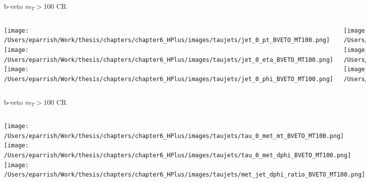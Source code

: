 \documentclass[aspectratio=169,xcolor=table]{beamer}
\begin{document}
    \begin{frame}[t]{b-veto $m_{T}>100$ CR}
      \begin{columns}[t]
          \texttt{[image: /Users/eparrish/Work/thesis/chapters/chapter6\_HPlus/images/taujets/jet\_0\_pt\_BVETO\_MT100.png]}
          \texttt{[image: /Users/eparrish/Work/thesis/chapters/chapter6\_HPlus/images/taujets/jet\_0\_eta\_BVETO\_MT100.png]}
          \texttt{[image: /Users/eparrish/Work/thesis/chapters/chapter6\_HPlus/images/taujets/jet\_0\_phi\_BVETO\_MT100.png]}

          \texttt{[image: /Users/eparrish/Work/thesis/chapters/chapter6\_HPlus/images/taujets/jet\_1\_pt\_BVETO\_MT100.png]}
          \texttt{[image: /Users/eparrish/Work/thesis/chapters/chapter6\_HPlus/images/taujets/jet\_1\_eta\_BVETO\_MT100.png]}
          \texttt{[image: /Users/eparrish/Work/thesis/chapters/chapter6\_HPlus/images/taujets/jet\_1\_phi\_BVETO\_MT100.png]}

          \texttt{[image: /Users/eparrish/Work/thesis/chapters/chapter6\_HPlus/images/taujets/jet\_2\_pt\_BVETO\_MT100.png]}
          \texttt{[image: /Users/eparrish/Work/thesis/chapters/chapter6\_HPlus/images/taujets/jet\_2\_eta\_BVETO\_MT100.png]}
          \texttt{[image: /Users/eparrish/Work/thesis/chapters/chapter6\_HPlus/images/taujets/jet\_2\_phi\_BVETO\_MT100.png]}

          \texttt{[image: /Users/eparrish/Work/thesis/chapters/chapter6\_HPlus/images/taujets/effm\_tau\_BVETO\_MT100.png]}

      \end{columns}
    \end{frame}

    \begin{frame}[t]{b-veto $m_{T}>100$ CR}
      \begin{columns}[t]
          \texttt{[image: /Users/eparrish/Work/thesis/chapters/chapter6\_HPlus/images/taujets/tau\_0\_met\_mt\_BVETO\_MT100.png]}
          \texttt{[image: /Users/eparrish/Work/thesis/chapters/chapter6\_HPlus/images/taujets/tau\_0\_met\_dphi\_BVETO\_MT100.png]}
          \texttt{[image: /Users/eparrish/Work/thesis/chapters/chapter6\_HPlus/images/taujets/met\_jet\_dphi\_ratio\_BVETO\_MT100.png]}

          \texttt{[image: /Users/eparrish/Work/thesis/chapters/chapter6\_HPlus/images/taujets/bjet\_0\_met\_dphi\_BVETO\_MT100.png]}
          \texttt{[image: /Users/eparrish/Work/thesis/chapters/chapter6\_HPlus/images/taujets/bjet\_0\_tau\_0\_dr\_BVETO\_MT100.png]}



      \end{columns}
    \end{frame}
\end{document}
